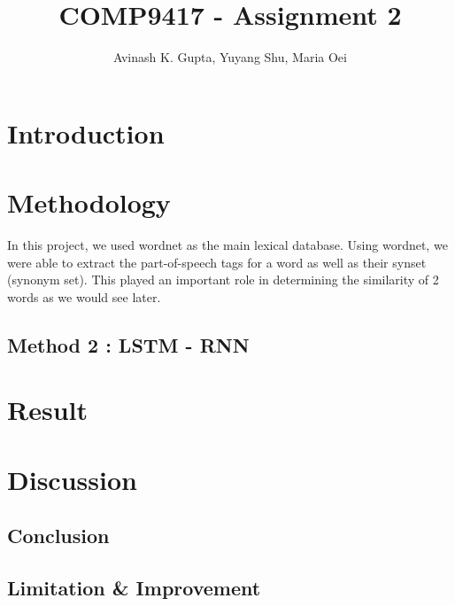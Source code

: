 \documentclass[11pt, oneside]{article}   	%
\title{COMP9417 - Assignment 2}
\author{Avinash K. Gupta, Yuyang Shu, Maria Oei}
\begin{document}
\maketitle

\section{Introduction}



\section{Methodology}
In this project, we used wordnet as the main lexical database. Using wordnet, we were able to extract the part-of-speech tags for a word as well as their synset (synonym set). This played an important role in determining the similarity of 2 words as we would see later.





\pagebreak
\subsection{Method 2 : LSTM - RNN}
%



\section{Result}
%

\section{Discussion}
\subsection{Conclusion}
 \subsection{Limitation \& Improvement}
\end{document}
